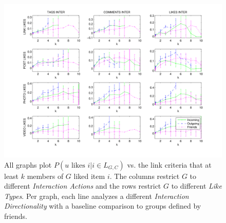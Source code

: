 %

\begin{figure}[t!]
\centering
\includegraphics[scale=0.70]{data/linktype_vs_inter_fix}
\vspace{-15mm}
\caption{All graphs plot $P(u \mbox{ likes } i | i \in L_{G,C})$
vs. the link criteria that at least $k$ members of $G$ liked item $i$.
The columns restrict $G$ to different 
\textit{Interaction Actions} and the rows restrict $G$ to
different \textit{Like Types}.    Per graph, each line 
analyzes a different \textit{Interaction Directionality} with
a baseline comparison to groups defined by friends.}
\label{fig:res3}
\end{figure}

